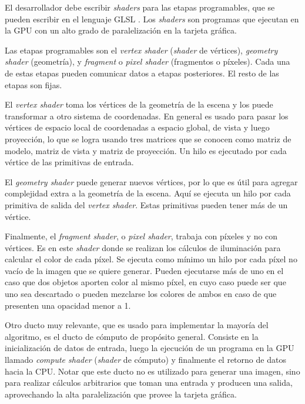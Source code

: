 El desarrollador debe escribir \textit{shaders} para las etapas programables, que se pueden escribir en el lenguaje GLSL \cite{glsl-spec}.
Los \textit{shaders} son programas que ejecutan en la GPU con un alto grado de paralelización en la tarjeta gráfica.

Las etapas programables son el \textit{vertex shader} (\textit{shader} de vértices), \textit{geometry shader} (geometría), y \textit{fragment} o \textit{pixel shader} (fragmentos o píxeles).
Cada una de estas etapas pueden comunicar datos a etapas posteriores.
El resto de las etapas son fijas.

El \textit{vertex shader} toma los vértices de la geometría de la escena y los puede transformar a otro sistema de coordenadas.
En general es usado para pasar los vértices de espacio local de coordenadas a espacio global, de vista y luego proyección, lo que se logra usando tres matrices que se conocen como matriz de modelo, matriz de vista y matriz de proyección.
Un hilo es ejecutado por cada vértice de las primitivas de entrada.

El \textit{geometry shader} puede generar nuevos vértices, por lo que es útil para agregar complejidad extra a la geometría de la escena.
Aquí se ejecuta un hilo por cada primitiva de salida del \textit{vertex shader}.
Estas primitivas pueden tener más de un vértice.

Finalmente, el \textit{fragment shader}, o \textit{pixel shader}, trabaja con píxeles y no con vértices.
Es en este \textit{shader} donde se realizan los cálculos de iluminación para calcular el color de cada píxel.
Se ejecuta como mínimo un hilo por cada píxel no vacío de la imagen que se quiere generar.
Pueden ejecutarse más de uno en el caso que dos objetos aporten color al mismo píxel, en cuyo caso puede ser que uno sea descartado o pueden mezclarse los colores de ambos en caso de que presenten una opacidad menor a 1.

Otro ducto muy relevante, que es usado para implementar la mayoría del algoritmo, es el ducto de cómputo de propósito general.
Consiste en la inicialización de datos de entrada, luego la ejecución de un programa en la GPU llamado \textit{compute shader} (\textit{shader} de cómputo) y finalmente el retorno de datos hacia la CPU.
Notar que este ducto no es utilizado para generar una imagen, sino para realizar cálculos arbitrarios que toman una entrada y producen una salida, aprovechando la alta paralelización que provee la tarjeta gráfica.


